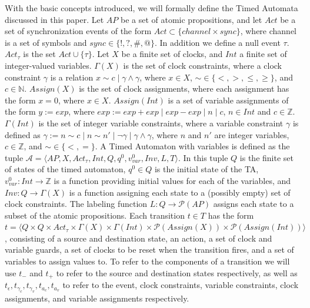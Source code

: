 \documentclass[a4paper,11pt]{report}
\newcommand*\BitOr{\mathbin{|}}
\theoremstyle{definition}
\begin{document}
With the basic concepts introduced, we will formally define the Timed Automata
discussed in this paper. Let \(AP\) be a set of atomic propositions, and let \(Act\) be a set of
synchronization events of the form $Act \subset \{channel \times sync\}$,
where channel is a set of symbols and $sync \in \{!,?,\#,@\}$. In addition we
define a null event \(\tau\). \(Act_{\tau}\) is the set \(Act \cup \{\tau\}\).
Let \(X\) be a finite set of clocks, and \(Int\) a finite set of integer-valued
variables. \(\Gamma(X)\) is the set of clock constraints, where a clock
constraint \(\gamma\) is a relation
\(x \sim c \BitOr \gamma \land \gamma\), where \(x \in X\),
\(\sim \in \{<,>,\leq,\geq\}\), and \(c \in \mathbb{N}\). \(Assign(X)\) is the set of
clock assignments, where each assignment has the form \(x {=} 0\), where
\(x \in X\iffalse{,\ c {\in} \mathbb{Z}^+}\fi\). \(Assign(Int)\) is a set of
variable assignments of the form \(y := exp\), where
\(exp := exp + exp\BitOr exp - exp\BitOr n\BitOr c\),
\(n \in Int\) and \(c \in \mathbb{Z}\). \(\Gamma(Int)\) is the set of integer
variable constraints, where a variable constraint \(\gamma\) is defined as
\(\gamma := n \sim c\BitOr n \sim n'\BitOr \neg \gamma\BitOr \gamma \land \gamma\),
where \(n\) and \(n'\) are integer variables, \(c \in \mathbb{Z}\), and
\(\sim \in \{<,=\}\). A Timed Automaton with variables is defined as the tuple
\(\mathcal{A} = \big \langle AP,X, Act_{\tau}, Int, Q, q^0, v_{var}^0, Inv, L, T \big \rangle\).
In this tuple \(Q\) is the finite set of states of the timed automaton,
\(q^0 \in Q\) is the initial state of the TA,
\(v_{var}^{0} : Int \rightarrow \mathbb{Z}\) is a function providing initial
values for each of the variables, and \(Inv : Q \rightarrow \Gamma(X)\) is a
function assigning each state to a (possibly empty) set of clock constraints.
The labeling function \(L: Q \rightarrow \mathcal{P}(AP)\) assigns each state to
a subset of the atomic propositions. Each transition \(t \in T\) has the form
\(t = \big \langle Q \times Q \times Act_{\tau} \times \Gamma(X) \times \Gamma(Int) \times \mathcal{P}(Assign(X)) \times \mathcal{P}(Assign(Int)) \big \rangle \),
consisting of a source and destination state, an action, a set of clock and
variable guards, a set of clocks to be reset when the transition fires, and a
set of variables to assign values to. To refer to the components of a transition
we will use \(t_-\) and \(t_+\) to refer to the source and destination states
respectively, as well as
\(t_\epsilon, t_{\gamma_c}, t_{\gamma_v}, t_{a_c}, t_{a_v}\) to refer to the
event, clock constraints, variable constraints, clock assignments, and variable
assignments respectively.
\end{document}
